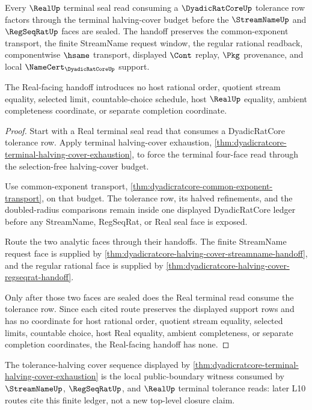 \begin{theorem}
\label{thm:dyadicratcore-halving-cover-real-handoff}
Every $\RealUp$ terminal seal read consuming a $\DyadicRatCoreUp$ tolerance row factors through the terminal halving-cover budget before the $\StreamNameUp$ and $\RegSeqRatUp$ faces are sealed. The handoff preserves the common-exponent transport, the finite StreamName request window, the regular rational readback, componentwise $\hsame$ transport, displayed $\Cont$ replay, $\Pkg$ provenance, and local $\NameCert_{\DyadicRatCoreUp}$ support.

The Real-facing handoff introduces no host rational order, quotient stream equality, selected limit, countable-choice schedule, host $\RealUp$ equality, ambient completeness coordinate, or separate completion coordinate.
\end{theorem}
\begin{proof}
Start with a Real terminal seal read that consumes a DyadicRatCore tolerance row. Apply terminal halving-cover exhaustion, \autoref{thm:dyadicratcore-terminal-halving-cover-exhaustion}, to force the terminal four-face read through the selection-free halving-cover budget.

Use common-exponent transport, \autoref{thm:dyadicratcore-common-exponent-transport}, on that budget. The tolerance row, its halved refinements, and the doubled-radius comparisons remain inside one displayed DyadicRatCore ledger before any StreamName, RegSeqRat, or Real seal face is exposed.

Route the two analytic faces through their handoffs. The finite StreamName request face is supplied by \autoref{thm:dyadicratcore-halving-cover-streamname-handoff}, and the regular rational face is supplied by \autoref{thm:dyadicratcore-halving-cover-regseqrat-handoff}.

Only after those two faces are sealed does the Real terminal read consume the tolerance row. Since each cited route preserves the displayed support rows and has no coordinate for host rational order, quotient stream equality, selected limits, countable choice, host Real equality, ambient completeness, or separate completion coordinates, the Real-facing handoff has none.
\end{proof}

The tolerance-halving cover sequence displayed by \autoref{thm:dyadicratcore-terminal-halving-cover-exhaustion} is the local public-boundary witness consumed by $\StreamNameUp$, $\RegSeqRatUp$, and $\RealUp$ terminal tolerance reads: later L10 routes cite this finite ledger, not a new top-level closure claim.

